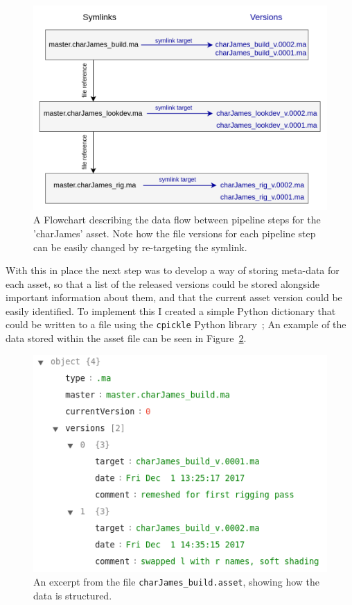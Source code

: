 \documentclass[11pt]{article}
\begin{document}
\begin{figure}[htbp]\centering
	\includegraphics[width=1.0\linewidth]{images/asset_pipeline.png}
	\caption{\label{figure:assetPipeline} A Flowchart describing the data flow between pipeline steps for the 'charJames' asset. Note how the file versions for each pipeline step can be easily changed by re-targeting the symlink.}
\end{figure}

With this in place the next step was to develop a way of storing meta-data for each asset, so that a list of the released versions could be stored alongside important information about them, and that the current asset version could be easily identified. To implement this I created a simple Python dictionary that could be written to a file using the \texttt{cpickle} Python library~\cite{cpickle}; An example of the data stored within the asset file can be seen in Figure~\ref{figure:exampleAsset}.

\begin{figure}[htbp]\centering
	\includegraphics[width=0.8\linewidth]{images/assetExample.png}
	\caption{\label{figure:exampleAsset} An excerpt from the file \texttt{charJames\_build.asset}, showing how the data is structured.}
\end{figure}
\end{document}
